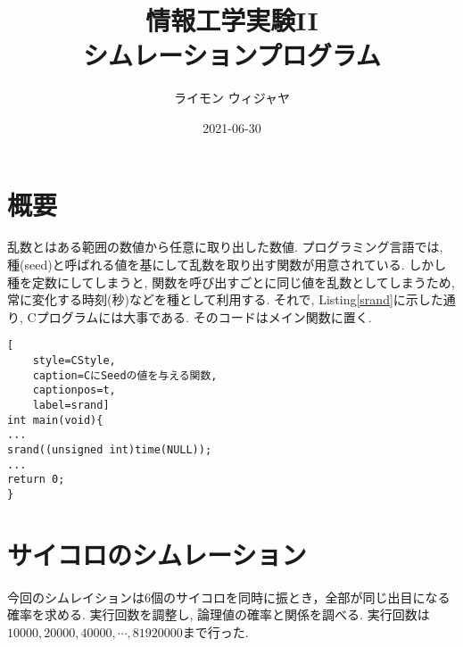 \documentclass[a4j, titlepage]{jarticle}
\title{情報工学実験II\\シムレーションプログラム}
\author{ライモン ウィジャヤ}
\date{2021-06-30}
\begin{document}
\maketitle
\tableofcontents
\clearpage


\section{概要}
乱数とはある範囲の数値から任意に取り出した数値. 
プログラミング言語では, 種(seed)と呼ばれる値を基にして乱数を取り出す関数が用意されている. 
しかし種を定数にしてしまうと, 関数を呼び出すごとに同じ値を乱数としてしまうため, 常に変化する時刻(秒)などを種として利用する. 
それで, Listing\ref{srand}に示した通り, Cプログラムには大事である. そのコードはメイン関数に置く. 
\vspace{20pt}
\begin{lstlisting}[
    style=CStyle,
    caption=CにSeedの値を与える関数,
    captionpos=t,
    label=srand]
int main(void){ 
...
srand((unsigned int)time(NULL));
...
return 0;
}
\end{lstlisting}

\section{サイコロのシムレーション}
今回のシムレイションは6個のサイコロを同時に振とき，全部が同じ出目になる確率を求める. 
実行回数を調整し, 論理値の確率と関係を調べる.
実行回数は$10000, 20000, 40000, \cdots , 81920000$まで行った.
\end{document}
